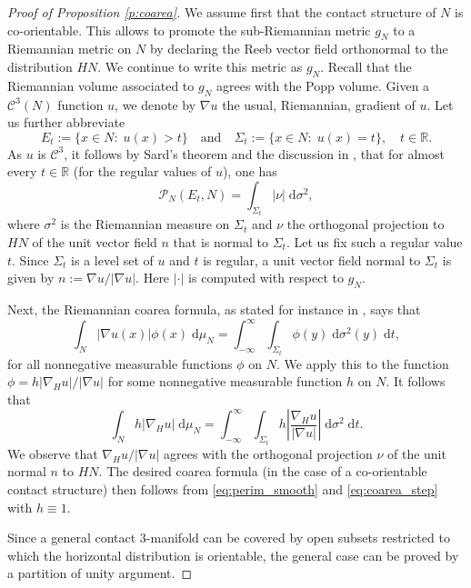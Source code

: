 \documentclass[10pt,letterpaper]{amsart}
\theoremstyle{definition}
\numberwithin{thm}{subsection}
\numberwithin{equation}{section}
\begin{document}
\begin{proof}[Proof of Proposition \ref{p:coarea}]

We assume first that the contact structure of $N$ is co-orientable.
This allows to promote the sub-Riemannian metric $g_N$ to a Riemannian metric on $N$ by declaring the Reeb vector field orthonormal to the distribution $HN$. We continue to write this metric as $g_N$. Recall that the Riemannian volume associated to $g_N$ agrees with the Popp volume. Given a $\mathcal{C}^{3}(N)$ function $u$, we denote by $\nabla u$ the usual, Riemannian, gradient of $u$. Let us further abbreviate
\begin{displaymath}
E_t:= \{x\in N:\; u(x)>t\}\quad \text{and}\quad \Sigma_t:= \{x\in N:\; u(x)=t\},\quad  t\in \mathbb{R}.
\end{displaymath}
As $u$ is $\mathcal{C}^3$, it follows by Sard's theorem and the discussion in \cite[\S 2.3]{MR3412382}, \cite[(2.9)]{MR2979606} that for almost every $t\in \mathbb{R}$ (for the regular values of $u$), one has
\begin{equation}\label{eq:perim_smooth}
\mathcal{P}_N(E_t,N)= \int_{\Sigma_t} |\nu| \;\mathrm{d}\sigma^2,
\end{equation}
where $\sigma^2$ is the Riemannian measure on $\Sigma_t$ and $\nu$ the orthogonal projection to $HN$ of the unit vector field $n$ that is normal to $\Sigma_t$.  Let us fix such a regular value $t$. Since $\Sigma_t$ is a level set of $u$ and $t$ is regular, a unit vector field normal to $\Sigma_t$ is given by $n:=\nabla u/|\nabla u|$. Here $|\cdot|$ is computed with respect to $g_N$.

 Next, the Riemannian coarea formula, as stated for instance in \cite[Corollary I.3.1]{MR1849187}, says that
\begin{displaymath}
\int_N |\nabla u(x)|\phi(x)\;\mathrm{d}\mu_N= \int_{-\infty}^{\infty} \int_{\Sigma_t} \phi(y) \;\mathrm{d}\sigma^2(y)\;\mathrm{d}t,
\end{displaymath}
for all nonnegative measurable functions $\phi$ on $N$. We apply this to the function $\phi= h|\nabla_H u|/|\nabla u| $ for some nonnegative measurable function $h$ on $N$.
It follows that
\begin{equation}\label{eq:coarea_step}
\int_N h |\nabla_H u|\;\mathrm{d}\mu_N = \int_{-\infty}^{\infty} \int_{\Sigma_t} h \left|\frac{\nabla_H u}{|\nabla u|}\right| \; \mathrm{d}\sigma^2\;\mathrm{d}t.
\end{equation}
We observe that $\nabla_H u/|\nabla u|$ agrees with the orthogonal projection $\nu$ of the unit normal $n$ to $HN$. The desired coarea formula (in the case of a co-orientable contact structure) then follows from \eqref{eq:perim_smooth} and \eqref{eq:coarea_step} with $h\equiv 1$.

Since a general contact $3$-manifold can be covered by open subsets restricted to which the horizontal distribution is orientable, the general case can be proved by a partition of unity argument.
\end{proof}
\end{document}
